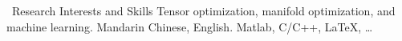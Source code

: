 
\begin{rubric}{\faLightbulb\ Research Interests and Skills}
\entry*[\bf Research]
	Tensor optimization, manifold optimization, and machine learning.
\entry*[\bf Languages]
	Mandarin Chinese, English.
	Matlab, C/C++, \LaTeX, \ldots
\end{rubric}
